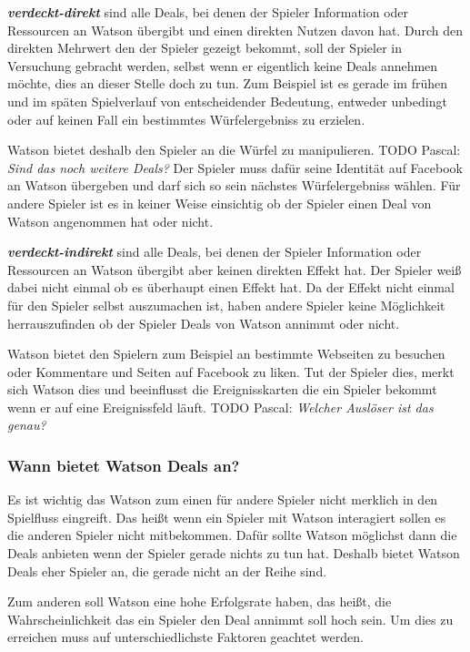 \documentclass[german]{cgspaper} %
\newcommand{\todo}[1]{\textit{#1}}
\newcommand{\Pascal}[1]{\textcolor{colorPascal}{TODO Pascal:} \todo{#1} }
\newcommand{\neuerBegriff}[1]{\textbf{\textit{#1}}}
\begin{document}
\neuerBegriff{verdeckt-direkt} sind alle Deals, bei denen der Spieler Information oder Ressourcen an Watson übergibt und einen direkten Nutzen davon hat. 
Durch den direkten Mehrwert den der Spieler gezeigt bekommt, soll der Spieler in Versuchung gebracht werden, selbst wenn er eigentlich keine Deals annehmen möchte, dies an dieser Stelle doch zu tun.
Zum Beispiel ist es gerade im frühen und im späten Spielverlauf von entscheidender Bedeutung, entweder unbedingt oder auf keinen Fall ein bestimmtes Würfelergebniss zu erzielen.

Watson bietet deshalb den Spieler an die Würfel zu manipulieren.
\Pascal{Sind das noch weitere Deals?}
Der Spieler muss dafür seine Identität auf Facebook an Watson übergeben und darf sich so sein nächstes Würfelergebniss wählen.
Für andere Spieler ist es in keiner Weise einsichtig ob der Spieler einen Deal von Watson angenommen hat oder nicht.

\neuerBegriff{verdeckt-indirekt} sind alle Deals, bei denen der Spieler Information oder Ressourcen an Watson übergibt aber keinen direkten Effekt hat.
Der Spieler weiß dabei nicht einmal ob es überhaupt einen Effekt hat.
Da der Effekt nicht einmal für den Spieler selbst auszumachen ist, haben andere Spieler keine Möglichkeit herrauszufinden ob der Spieler Deals von Watson annimmt oder nicht.

Watson bietet den Spielern zum Beispiel an bestimmte Webseiten zu besuchen oder Kommentare und Seiten auf Facebook zu liken.
Tut der Spieler dies, merkt sich Watson dies und beeinflusst die Ereignisskarten die ein Spieler bekommt wenn er auf eine Ereignissfeld läuft.
\Pascal{Welcher Auslöser ist das genau?}

\subsubsection{Wann bietet Watson Deals an?}

Es ist wichtig das Watson zum einen für andere Spieler nicht merklich in den Spielfluss eingreift.
Das heißt wenn ein Spieler mit Watson interagiert sollen es die anderen Spieler nicht mitbekommen.
Dafür sollte Watson möglichst dann die Deals anbieten wenn der Spieler gerade nichts zu tun hat.
Deshalb bietet Watson Deals eher Spieler an, die gerade nicht an der Reihe sind.

Zum anderen soll Watson eine hohe Erfolgsrate haben, das heißt, die Wahrscheinlichkeit das ein Spieler den Deal annimmt soll hoch sein.
Um dies zu erreichen muss auf unterschiedlichste Faktoren geachtet werden. 
\end{document}

